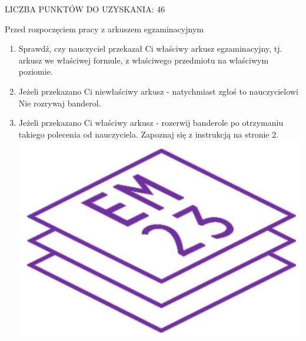 \documentclass[10pt]{article}
\begin{document}
LICZBA PUNKTÓW DO UZYSKANIA: 46

Przed rozpoczęciem pracy z arkuszem egzaminacyjnym

\begin{enumerate}
  \item Sprawdź, czy nauczyciel przekazał Ci właściwy arkusz egzaminacyjny, tj. arkusz we właściwej formule, z właściwego przedmiotu na właściwym poziomie.
  \item Jeżeli przekazano Ci niewłaściwy arkusz - natychmiast zgłoś to nauczycielowi Nie rozrywaj banderol.
  \item Jeżeli przekazano Ci właściwy arkusz - rozerwij banderole po otrzymaniu takiego polecenia od nauczyciela. Zapoznaj się z instrukcją na stronie 2.\\
\includegraphics[max width=\textwidth, center]{2024_11_21_daeb5e5efb43dd4cb535g-02}
\end{enumerate}
\end{document}
